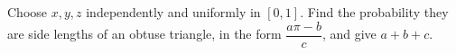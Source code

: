 Choose $x,y,z$ independently and uniformly in $[0,1]$. Find the probability they are side lengths of an obtuse triangle, in the form $\dfrac{a\pi-b}{c}$, and give $a+b+c$.

